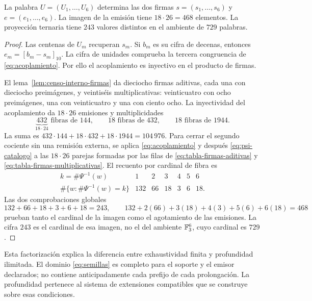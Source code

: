 \begin{proposition}
\label{prop:factorizacion-emision-interna}
La palabra \(U=(U_1,\ldots,U_6)\) determina las dos firmas \(s=(s_1,\ldots,s_6)\) y \(e=(e_1,\ldots,e_6)\). La imagen de la emisión tiene \(18\cdot26=468\) elementos. La proyección ternaria tiene \(243\) valores distintos en el ambiente de \(729\) palabras.
\end{proposition}
\begin{proof}
Las centenas de \(U_m\) recuperan \(s_m\). Si \(b_m\) es su cifra de decenas, entonces \(e_m=[b_m-s_m]_{10}\). La cifra de unidades comprueba la tercera congruencia de \eqref{eq:acoplamiento}. Por ello el acoplamiento es inyectivo en el producto de firmas.

El lema~\ref{lem:censo-interno-firmas} da dieciocho firmas aditivas, cada una
con dieciocho preimágenes, y veintiséis multiplicativas: veinticuatro con
ocho preimágenes, una con veinticuatro y una con ciento ocho. La inyectividad
del acoplamiento da \(18\cdot26\) emisiones y multiplicidades
\[
 \underbrace{432}_{18\cdot24}\text{ fibras de }144,
 \qquad18\text{ fibras de }432,
 \qquad18\text{ fibras de }1944.
\]
La suma es \(432\cdot144+18\cdot432+18\cdot1944=104\,976\). Para cerrar
el segundo cociente sin una remisión externa, se aplica
\eqref{eq:acoplamiento} y después \eqref{eq:psi-catalogo} a las
\(18\cdot26\) parejas formadas por las filas de
\eqref{eq:tabla-firmas-aditivas} y
\eqref{eq:tabla-firmas-multiplicativas}. El recuento por cardinal de fibra es
\[
\begin{array}{c|rrrrrr}
k=\#\Psi^{-1}(w)&1&2&3&4&5&6\\ \hline
\#\{w:\#\Psi^{-1}(w)=k\}&132&66&18&3&6&18.
\end{array}
\tag{C}
\label{eq:histograma-proyeccion-ternaria}
\]
Las dos comprobaciones globales
\[
132+66+18+3+6+18=243,
\qquad
132+2(66)+3(18)+4(3)+5(6)+6(18)=468
\]
prueban tanto el cardinal de la imagen como el agotamiento de las emisiones.
La cifra \(243\) es el cardinal de esa imagen, no el del ambiente
\(\mathbb F_3^6\), cuyo cardinal es \(729\).
\end{proof}

Esta factorización explica la diferencia entre exhaustividad finita y profundidad ilimitada. El dominio \eqref{eq:semillas} es completo para el soporte y el emisor declarados; no contiene anticipadamente cada prefijo de cada prolongación. La profundidad pertenece al sistema de extensiones compatibles que se construye sobre esas condiciones.


